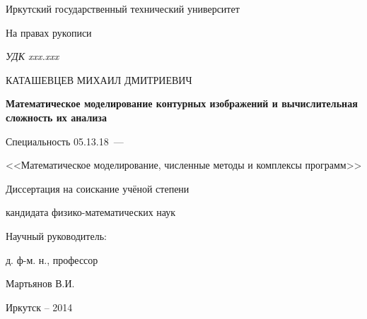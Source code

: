 \thispagestyle{empty}

\begin{center}
Иркутский государственный технический университет\par
\par
\end{center}

\vspace{20mm}
\begin{flushright}
На правах рукописи

{\sl УДК xxx.xxx}
\end{flushright}

\vspace{30mm}
\begin{center}
{\large КАТАШЕВЦЕВ МИХАИЛ ДМИТРИЕВИЧ}
\end{center}

\vspace{5mm}
\begin{center}
{\bf \large Математическое моделирование контурных изображений и вычислительная сложность их анализа
\par}

\vspace{10mm}
{%
Специальность 05.13.18~---

<<Математическое моделирование, численные методы и комплексы программ>>
}

\vspace{10mm}
Диссертация на соискание учёной степени

кандидата физико-математических наук
\end{center}

\vspace{20mm}
\begin{flushright}
Научный руководитель:

д. ф-м. н., профессор

Мартьянов В.И.

\end{flushright}

\vspace{20mm}
\begin{center}
{Иркутск -- 2014}
\end{center}

\newpage